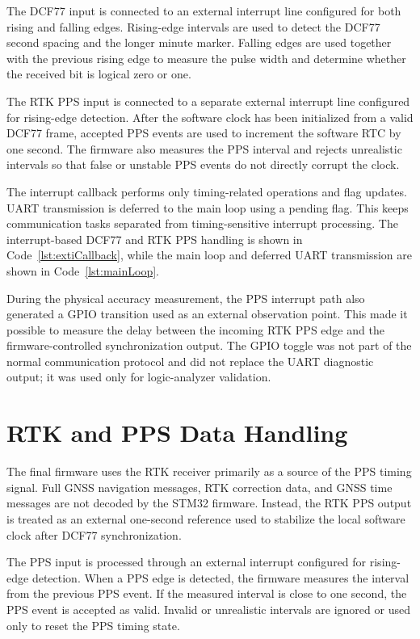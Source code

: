 The DCF77 input is connected to an external interrupt line configured for both rising and falling edges. Rising-edge intervals are used to detect the DCF77 second spacing and the longer minute marker. Falling edges are used together with the previous rising edge to measure the pulse width and determine whether the received bit is logical zero or one.

The RTK PPS input is connected to a separate external interrupt line configured for rising-edge detection. After the software clock has been initialized from a valid DCF77 frame, accepted PPS events are used to increment the software RTC by one second. The firmware also measures the PPS interval and rejects unrealistic intervals so that false or unstable PPS events do not directly corrupt the clock.

The interrupt callback performs only timing-related operations and flag updates. UART transmission is deferred to the main loop using a pending flag. This keeps communication tasks separated from timing-sensitive interrupt processing. The interrupt-based DCF77 and RTK PPS handling is shown in Code~\ref{lst:extiCallback}, while the main loop and deferred UART transmission are shown in Code~\ref{lst:mainLoop}.

During the physical accuracy measurement, the PPS interrupt path also generated a GPIO transition used as an external observation point. This made it possible to measure the delay between the incoming RTK PPS edge and the firmware-controlled synchronization output. The GPIO toggle was not part of the normal communication protocol and did not replace the UART diagnostic output; it was used only for logic-analyzer validation.

\section{RTK and PPS Data Handling}

The final firmware uses the RTK receiver primarily as a source of the PPS timing signal. Full GNSS navigation messages, RTK correction data, and GNSS time messages are not decoded by the STM32 firmware. Instead, the RTK PPS output is treated as an external one-second reference used to stabilize the local software clock after DCF77 synchronization.

The PPS input is processed through an external interrupt configured for rising-edge detection. When a PPS edge is detected, the firmware measures the interval from the previous PPS event. If the measured interval is close to one second, the PPS event is accepted as valid. Invalid or unrealistic intervals are ignored or used only to reset the PPS timing state.

